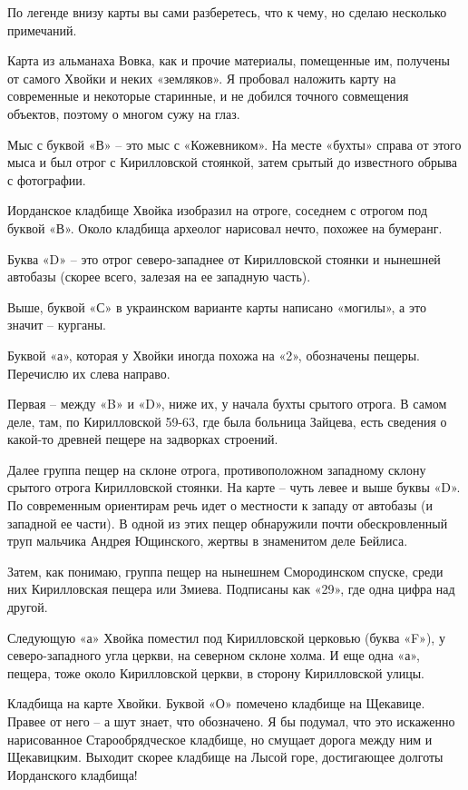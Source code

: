 По легенде внизу карты вы сами разберетесь, что к чему, но сделаю несколько примечаний.

Карта из альманаха Вовка, как и прочие материалы, помещенные им, получены от самого Хвойки и неких «земляков». Я пробовал наложить карту на современные и некоторые старинные, и не добился точного совмещения объектов, поэтому о многом сужу на глаз.

Мыс с буквой «В» – это мыс с «Кожевником». На месте «бухты» справа от этого мыса и был отрог с Кирилловской стоянкой, затем срытый до известного обрыва с фотографии.

Иорданское кладбище Хвойка изобразил на отроге, соседнем с отрогом под буквой «В». Около кладбища археолог нарисовал нечто, похожее на бумеранг. 

Буква «D» – это отрог северо-западнее от Кирилловской стоянки и нынешней автобазы (скорее всего, залезая на ее западную часть).

Выше, буквой «С» в украинском варианте карты написано «могилы», а это значит – курганы.

Буквой «а», которая у Хвойки иногда похожа на «2», обозначены пещеры. Перечислю их слева направо.

Первая – между «B» и «D», ниже их, у начала бухты срытого отрога. В самом деле, там, по Кирилловской 59-63, где была больница Зайцева, есть сведения о какой-то древней пещере на задворках строений.

Далее группа пещер на склоне отрога, противоположном западному склону срытого отрога Кирилловской стоянки. На карте – чуть левее и выше буквы «D». По современным ориентирам речь идет о местности к западу от автобазы (и западной ее части). В одной из этих пещер обнаружили почти обескровленный труп мальчика Андрея Ющинского, жертвы в знаменитом деле Бейлиса.

Затем, как понимаю, группа пещер на нынешнем Смородинском спуске, среди них Кирилловская пещера или Змиева. Подписаны как «29», где одна цифра над другой.

Следующую «а» Хвойка поместил под Кирилловской церковью (буква «F»), у северо-западного угла церкви, на северном склоне холма. И еще одна «а», пещера, тоже около Кирилловской церкви, в сторону Кирилловской улицы.

Кладбища на карте Хвойки. Буквой «О» помечено кладбище на Щекавице. Правее от него – а шут знает, что обозначено. Я бы подумал, что это искаженно нарисованное Старообрядческое кладбище, но смущает дорога между ним и Щекавицким. Выходит скорее кладбище на Лысой горе, достигающее долготы Иорданского кладбища!  

